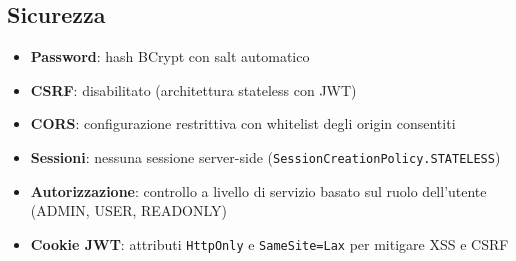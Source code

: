 \subsection{Sicurezza}

\begin{itemize}
    \item \textbf{Password}: hash BCrypt con salt automatico
    \item \textbf{CSRF}: disabilitato (architettura stateless con JWT)
    \item \textbf{CORS}: configurazione restrittiva con whitelist degli origin consentiti
    \item \textbf{Sessioni}: nessuna sessione server-side (\texttt{SessionCreationPolicy.STATELESS})
    \item \textbf{Autorizzazione}: controllo a livello di servizio basato sul
          ruolo dell'utente (ADMIN, USER, READONLY)
    \item \textbf{Cookie JWT}: attributi \texttt{HttpOnly} e \texttt{SameSite=Lax}
          per mitigare XSS e CSRF
\end{itemize}

